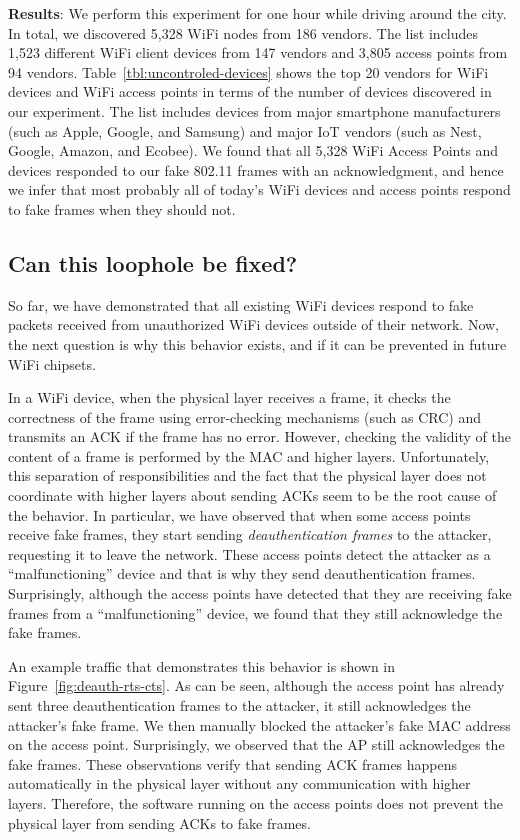 \vspace{0.05in}
\noindent
\textbf{Results}: We perform this experiment for one hour while driving around the city. In total, we discovered 5,328 WiFi nodes from 186 vendors. The list includes 1,523 different WiFi client devices from 147 vendors and 3,805 access points from 94 vendors. Table~\ref{tbl:uncontroled-devices} shows the top 20 vendors for WiFi devices and WiFi access points in terms of the number of devices discovered in our experiment. The list includes devices from major smartphone manufacturers (such as Apple, Google, and Samsung) and major IoT vendors (such as Nest, Google, Amazon, and Ecobee). We found that all 5,328 WiFi Access Points and devices responded to our fake 802.11 frames with an acknowledgment, and hence we infer that most probably all of today's WiFi devices and access points respond to fake frames when they should not.

\subsection{Can this loophole be fixed?}\label{sec:cannot-be-fixed}
So far, we have demonstrated that all existing WiFi devices respond to fake packets received from unauthorized WiFi devices outside of their network. Now, the next question is why this behavior exists, and if it can be prevented in future WiFi chipsets.

In a WiFi device, when the physical layer receives a frame, it checks the correctness of the frame using error-checking mechanisms (such as CRC) and transmits an ACK if the frame has no error. However, checking the validity of the content of a frame is performed by the MAC and higher layers. Unfortunately, this separation of responsibilities and the fact that the physical layer does not coordinate with higher layers about sending ACKs seem to be the root cause of the behavior. In particular, we have observed that when some access points receive fake frames, they start sending \emph{deauthentication frames} to the attacker, requesting it to leave the network. %
These access points detect the attacker as a ``malfunctioning'' device and that is why they send deauthentication frames. Surprisingly, although the access points have detected that they are receiving fake frames from a ``malfunctioning'' device, we found that they still acknowledge the fake frames.

An example traffic that demonstrates this behavior is shown in Figure~\ref{fig:deauth-rts-cts}. As can be seen, although the access point has already sent three deauthentication frames to the attacker, it still acknowledges the attacker's fake frame. We then manually blocked the attacker's fake MAC address on the access point. Surprisingly, we observed that the AP still acknowledges the fake frames. These observations verify that sending ACK frames happens automatically in the physical layer without any communication with higher layers. Therefore, the software running on the access points does not prevent the physical layer from sending ACKs to fake frames.

